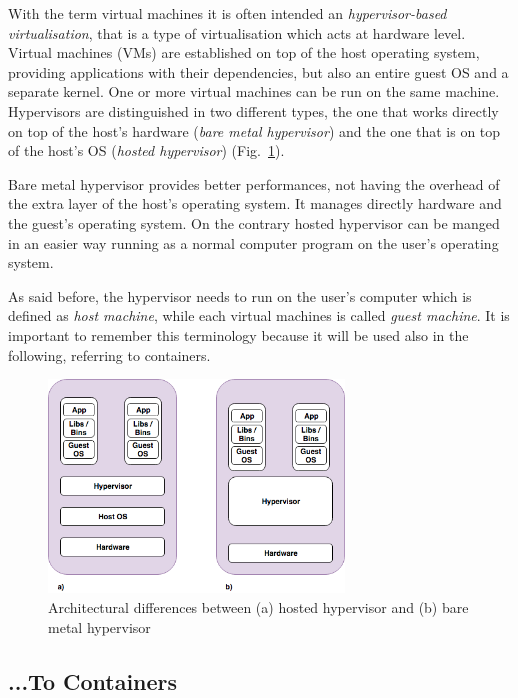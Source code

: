 \documentclass[a4paper,12pt]{article}
\def\myfig#1{Fig.~#1\xspace}
\begin{document}
With the term virtual machines it is often intended an \textit{hypervisor-based
virtualisation}, that is a type of virtualisation which acts at hardware level.
Virtual machines (VMs) are established on top of the host operating system,
providing applications with their dependencies, but also an entire guest OS and
a separate kernel. One or more virtual machines can be run on the same machine.
Hypervisors are distinguished in two different types, the one that works
directly on top of the host's hardware (\textit{bare metal hypervisor}) and the
one that is on top of the host's OS (\textit{hosted hypervisor})
(\myfig{\ref{fig:hypervisor_difference}}). \par Bare metal hypervisor provides
better performances, not having the overhead of the extra layer of the host's
operating system. It manages directly hardware and the guest's operating system.
On the contrary hosted hypervisor can be manged in an easier way running as a
normal computer program on the user's operating
system\cite{types_of_hypervisor}. \par As said before, the hypervisor needs to
run on the user's computer which is defined as \textit{host machine}, while each
virtual machines is called \textit{guest machine}. It is important to remember
this terminology because it will be used also in the following, referring to
containers. 

\begin{figure}[ht!]
  \centerline{\includegraphics[width=0.7\textwidth]{difference_bare_metal_hosted_hypervisor.png}}
  \caption{Architectural differences between (a) hosted hypervisor and (b) bare metal hypervisor}
  \label{fig:hypervisor_difference}
  \end{figure}


\subsection{...To Containers}
\end{document}
